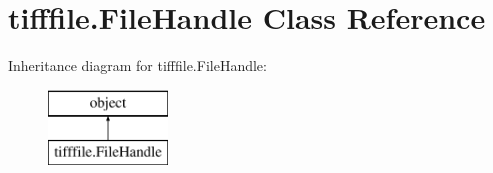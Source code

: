 \hypertarget{classtifffile_1_1FileHandle}{\section{tifffile.\-File\-Handle Class Reference}
\label{classtifffile_1_1FileHandle}
}
Inheritance diagram for tifffile.\-File\-Handle\-:\begin{figure}[H]
\begin{center}
\leavevmode
\includegraphics[height=2.000000cm]{classtifffile_1_1FileHandle}
\end{center}
\end{figure}
